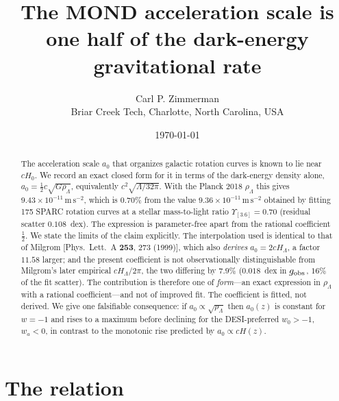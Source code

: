 \documentclass[11pt]{article}
\title{The MOND acceleration scale is one half of the dark-energy gravitational rate}
\author{Carl P. Zimmerman\\[2pt]
        \normalsize Briar Creek Tech, Charlotte, North Carolina, USA}
\date{\today}
\begin{document}
\maketitle

\begin{abstract}
The acceleration scale $a_0$ that organizes galactic rotation curves is known to lie near $cH_0$.
We record an exact closed form for it in terms of the dark-energy density alone,
$a_0 = \tfrac{1}{2}c\sqrt{G\rho_\Lambda}$, equivalently $c^2\sqrt{\Lambda/32\pi}$.
With the Planck 2018 $\rho_\Lambda$ this gives $9.43\times10^{-11}\,\mathrm{m\,s^{-2}}$, which is
$0.70\%$ from the value $9.36\times10^{-11}\,\mathrm{m\,s^{-2}}$ obtained by fitting 175 SPARC
rotation curves at a stellar mass-to-light ratio $\Upsilon_{[3.6]}=0.70$ (residual scatter
$0.108$~dex). The expression is parameter-free apart from the rational coefficient $\tfrac12$.
We state the limits of the claim explicitly. The interpolation used is identical to that of
Milgrom [Phys.\ Lett.\ A \textbf{253}, 273 (1999)], which also \emph{derives}
$a_0 = 2cH_\Lambda$, a factor $11.58$ larger; and the present coefficient is not observationally
distinguishable from Milgrom's later empirical $cH_\Lambda/2\pi$, the two differing by $7.9\%$
($0.018$~dex in $g_{\rm obs}$, $16\%$ of the fit scatter). The contribution is therefore one of
\emph{form}---an exact expression in $\rho_\Lambda$ with a rational coefficient---and not of improved
fit. The coefficient is fitted, not derived. We give one falsifiable consequence: if
$a_0\propto\sqrt{\rho_\Lambda}$ then $a_0(z)$ is constant for $w=-1$ and rises to a maximum before
declining for the DESI-preferred $w_0>-1$, $w_a<0$, in contrast to the monotonic rise predicted by
$a_0 \propto cH(z)$.
\end{abstract}


\section{The relation}
\end{document}

